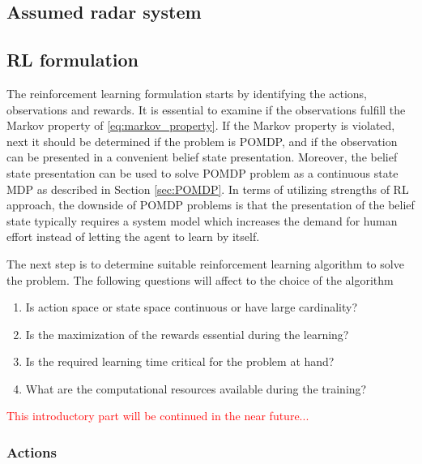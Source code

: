 \documentclass[english, 12pt, a4paper, elec, utf8, a-1b, online]{aaltothesis}
\begin{document}
\subsection{Assumed radar system} \label{seq:system_description}



\subsection{RL formulation}\label{sec:RL_formulation}

The reinforcement learning formulation starts by identifying the actions, observations and rewards.
It is essential to examine if the observations fulfill the Markov property of \eqref{eq:markov_property}.
If the Markov property is violated, next it should be determined if the problem is POMDP, and if the observation can be presented in a convenient belief state presentation.
Moreover, the belief state presentation can be used to solve POMDP problem as a continuous state MDP as described in Section \ref{sec:POMDP}.
In terms of utilizing strengths of RL approach, the downside of POMDP problems is that the presentation of the belief state typically requires a system model which increases the demand for human effort instead of letting the agent to learn by itself.



The next step is to determine suitable reinforcement learning algorithm to solve the problem.
The following questions will affect to the choice of the algorithm
\begin{enumerate}
    \item Is action space or state space continuous or have large cardinality? \label{enum:question_spaces}
    \item Is the maximization of the rewards essential during the learning? \label{enum:on_off_policy}
    \item Is the required learning time critical for the problem at hand? \label{enum:question_learning_speed}
    \item What are the computational resources available during the training? \label{enum:question_resources}
\end{enumerate}
\textcolor{red}{This introductory part will be continued in the near future...}

\subsubsection{Actions} \label{sec:actions}
\end{document}
